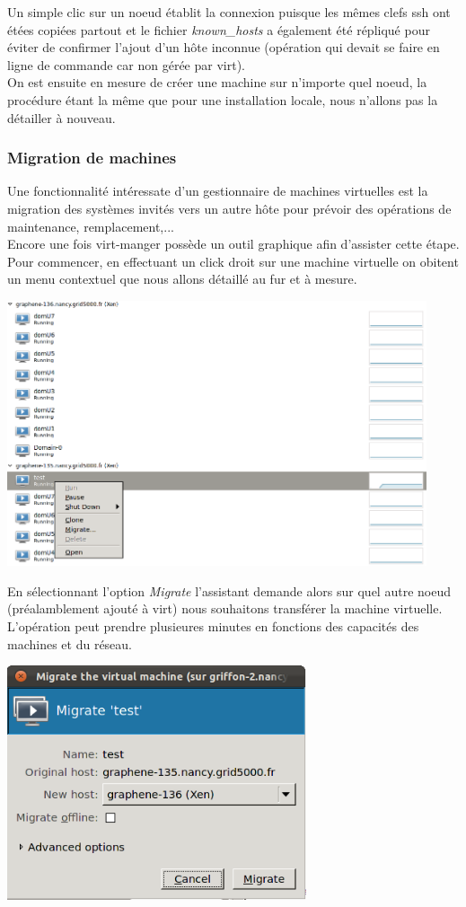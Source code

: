 Un simple clic sur un noeud établit la connexion puisque les mêmes clefs ssh ont étées copiées partout et le fichier \emph{known\_hosts} a également été répliqué pour éviter de confirmer l'ajout d'un hôte inconnue (opération qui devait se faire en ligne de commande car non gérée par virt).
\\
On est ensuite en mesure de créer une machine sur n'importe quel noeud, la procédure étant la même que pour une installation locale, nous n'allons pas la détailler à nouveau.

\subsubsection{Migration de machines}
Une fonctionnalité intéressate d'un gestionnaire de machines virtuelles est la migration des systèmes invités vers un autre hôte pour prévoir des opérations de maintenance, remplacement,...\\
Encore une fois virt-manger possède un outil graphique afin d'assister cette étape. Pour commencer, en effectuant un click droit sur une machine virtuelle on obitent un menu contextuel que nous allons détaillé au fur et à mesure.
\begin{center}
  \includegraphics[width=350pt]{images/virt-menu-context.png}
\end{center}
En sélectionnant l'option \emph{Migrate} l'assistant demande alors sur quel autre noeud (préalamblement ajouté à virt) nous souhaitons transférer la machine virtuelle. L'opération peut prendre plusieures minutes en fonctions des capacités des machines et du réseau.
\begin{center}
  \includegraphics[width=250pt]{images/migration1.png}
\end{center}
